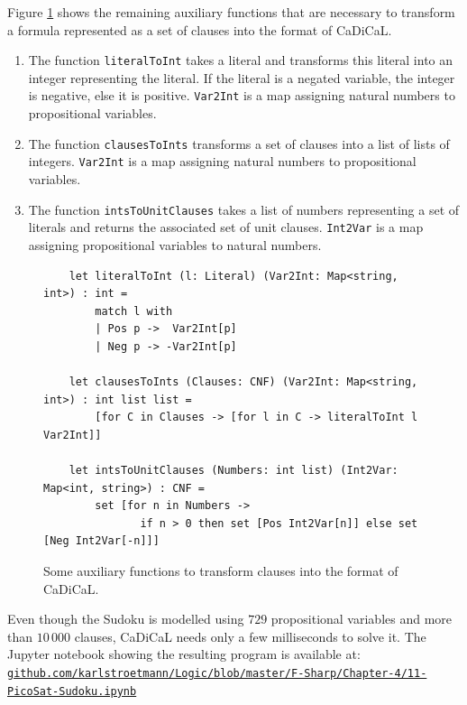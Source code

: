 \pagebreak
Figure \ref{fig:sudoku-format} shows the remaining auxiliary functions that are necessary to transform a
formula represented as a set of clauses into the format of CaDiCaL.
\begin{enumerate}
\item The function \texttt{literalToInt} takes a literal and transforms this literal into an integer
      representing the literal. If the literal is a negated variable, the integer is negative, else it is
      positive. \texttt{Var2Int} is a map assigning natural numbers to propositional variables.
\item The function \texttt{clausesToInts} transforms a set of clauses into a list of lists of
      integers. \texttt{Var2Int} is a map assigning natural numbers to propositional variables.  
\item The function \texttt{intsToUnitClauses} takes a list of numbers representing a set of literals and returns
      the associated set of unit clauses.  \texttt{Int2Var} is a map assigning propositional variables to
      natural numbers.     
\end{enumerate}

\begin{figure}[!ht]
\centering
\begin{verbatim}
    let literalToInt (l: Literal) (Var2Int: Map<string, int>) : int =
        match l with
        | Pos p ->  Var2Int[p]
        | Neg p -> -Var2Int[p]

    let clausesToInts (Clauses: CNF) (Var2Int: Map<string, int>) : int list list =
        [for C in Clauses -> [for l in C -> literalToInt l Var2Int]]

    let intsToUnitClauses (Numbers: int list) (Int2Var: Map<int, string>) : CNF =
        set [for n in Numbers ->
               if n > 0 then set [Pos Int2Var[n]] else set [Neg Int2Var[-n]]]
\end{verbatim}
\vspace*{-0.3cm}
\caption{Some auxiliary functions to transform clauses into the format of CaDiCaL.}
\label{fig:sudoku-format}
\end{figure}

Even though the Sudoku is modelled using $729$ propositional variables and more than $10\,000$ clauses,
CaDiCaL needs only a few milliseconds to solve it.  The Jupyter notebook showing the resulting program is
available at:
\\[0.2cm]
\href{https://github.com/karlstroetmann/Logic/blob/master/F-Sharp/Chapter-4/11-PicoSat-Sudoku.ipynb}{\small\texttt{github.com/karlstroetmann/Logic/blob/master/F-Sharp/Chapter-4/11-PicoSat-Sudoku.ipynb}}


